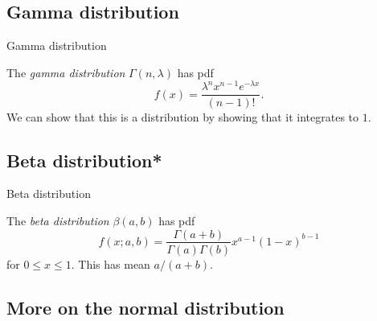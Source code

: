 \subsection{Gamma distribution}

%
\begin{note}
  \begin{field}
    Gamma distribution
  \end{field}
  \begin{field}
    \begin{defi}
      The \emph{gamma distribution} $\Gamma(n, \lambda)$ has pdf
      \[
        f(x) = \frac{\lambda^n x^{n - 1}e^{-\lambda x}}{(n - 1)!}.
      \]
      We can show that this is a distribution by showing that it integrates to $1$.
    \end{defi}
  \end{field}
  \xplain{}%
\end{note}

\subsection{Beta distribution*}

%
\begin{note}
  \begin{field}
    Beta distribution
  \end{field}
  \begin{field}
    \begin{defi}
      The \emph{beta distribution} $\beta(a, b)$ has pdf
      \[
        f(x; a, b) = \frac{\Gamma(a + b)}{\Gamma(a)\Gamma(b)}x^{a - 1}(1 - x)^{b - 1}
      \]
      for $0 \leq x \leq 1$.
      This has mean $a/(a + b)$.
    \end{defi}
  \end{field}
  \xplain{}%
\end{note}

\subsection{More on the normal distribution}

